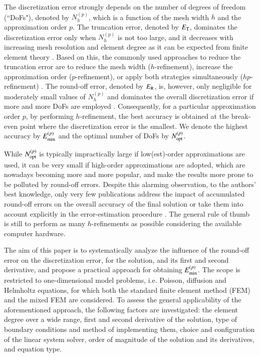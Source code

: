 \documentclass[review,3p]{elsarticle}
\begin{document}
The discretization error strongly depends on the number of degrees of freedom (``DoFs"), denoted by $N_h^{(p)}$, which is a function of the mesh width $h$ and the approximation order $p$. The truncation error, denoted by ${E}_{\rm {T}}$, dominates the discretization error only when $N_h^{(p)}$ is not too large, and it decreases with increasing mesh resolution and element degree as it can be expected from finite element theory \cite{gockenbach2006understanding}. Based on this, the commonly used approaches to reduce the truncation error are to reduce the mesh width ($h$-refinement), increase the approximation order ($p$-refinement), or apply both strategies simultaneously ($hp$-refinement) \cite{guo1986hp}. 
The round-off error, denoted by ${E}_{\rm R}$, is, however, only negligible for moderately small values of $N_h^{(p)}$ and dominates the overall discretization error if more and more DoFs are employed \cite{Babuska2018Roundoff}. 
Consequently, for a particular approximation order $p$, by performing $h$-refinement, the best accuracy is obtained at the break-even point where the discretization error is the smallest. We denote the highest accuracy by ${E}_{\rm {min}}^{(p)}$ and the optimal number of DoFs by $N_{\rm opt}^{(p)}$.

While $N_{\rm opt}^{(p)}$ is typically impractically large if low(est)-order approximations are used, it can be very small if high-order approximations are adopted, which are nowadays becoming more and more popular, and make the results more prone to be polluted by round-off errors.
Despite this alarming observation, to the authors’ best knowledge, only very few publications address the impact of accumulated round-off errors on the overall accuracy of the final solution \cite{ling1984numerical,mou2017example} or take them into account explicitly in the error-estimation procedure {\cite{ainsworth1992procedure,kelly1983posteriori}}.
The general rule of thumb is still to perform as many $h$-refinements as possible considering the available computer hardware.

The aim of this paper is to systematically analyze the influence of the round-off error on the discretization error, for the solution, and its first and second derivative, and propose a practical approach for obtaining ${E}_{\rm {min}}^{(p)}$.
The scope is restricted to one-dimensional model problems, i.e. Poisson, diffusion and Helmholtz equations, for which both the standard finite element method (FEM) and the mixed FEM\cite{boffi2013mixed} are considered.
To assess the general applicability of the aforementioned approach, the following factors are investigated: the element degree over a wide range, first and second derivative of the solution, type of boundary conditions and method of implementing them, choice and configuration of the linear system solver, order of magnitude of the solution and its derivatives, and equation type.
\end{document}
